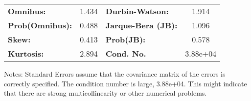 \documentclass[11pt]{article}
\begin{document}
\begin{center}
\begin{tabular}{lcccccc}
\bottomrule
\end{tabular}
\begin{tabular}{lclc}
\textbf{Omnibus:}       &  1.434 & \textbf{  Durbin-Watson:     } &    1.914  \\
\textbf{Prob(Omnibus):} &  0.488 & \textbf{  Jarque-Bera (JB):  } &    1.096  \\
\textbf{Skew:}          &  0.413 & \textbf{  Prob(JB):          } &    0.578  \\
\textbf{Kurtosis:}      &  2.894 & \textbf{  Cond. No.          } & 3.88e+04  \\
\bottomrule
\end{tabular}
\end{center}

Notes: \newline
 [1] Standard Errors assume that the covariance matrix of the errors is correctly specified. \newline
 [2] The condition number is large, 3.88e+04. This might indicate that there are \newline
 strong multicollinearity or other numerical problems.

    
\end{document}
